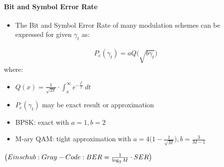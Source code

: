 \documentclass[a4paper, 10pt]{article}
\begin{document}
\paragraph{Bit and Symbol Error Rate}
\begin{itemize}
	\item The Bit and Symbol Error Rate of many modulation schemes can be expressed for given $\gamma_t$ as:
\end{itemize}
\begin{align*}
	P_e(\gamma_t) = aQ\bigl( \sqrt{b\gamma_t}\bigr)
\end{align*}
where:
\begin{itemize}
	\item $Q(x) = \frac{1}{\sqrt{2\pi}}\cdot\int_{x}^{\infty} e^{-\frac{t^2}{2}}~dt$
	\item $P_e(\gamma_t)$ may be exact result or approximation
	\item BPSK: exact with $a = 1, b = 2$
	\item M-ary QAM: tight approximation with $a = 4\bigl (1-\frac{1}{\sqrt{M}}\bigr ), b =  \frac{3}{M - 1}$
\end{itemize}
\begin{math} \bigl ({\small Einschub: Gray-Code: {BER} = \frac{1}{\log_2M} \cdot {SER} }\bigr ) \end{math}
\end{document}

